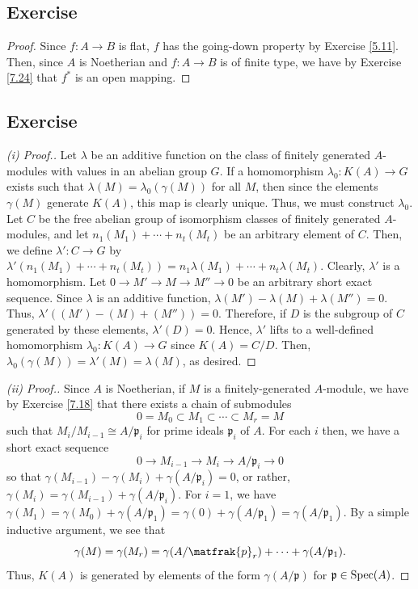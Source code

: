 \subsection{Exercise}\label{7.25}

\begin{proof}
Since $f : A \to B$ is flat, $f$ has the going-down property by Exercise \ref{5.11}. Then, since $A$ is Noetherian and $f : A \to B$ is of finite type,
we have by Exercise \ref{7.24} that $f^*$ is an open mapping.
\end{proof}

\subsection{Exercise}\label{7.26}

\begin{proof}[(i) Proof.]
Let $\lambda$ be an additive function on the class of finitely generated $A$-modules with values in an abelian group $G$. If a homomorphism 
$\lambda_0 : K(A) \to G$ exists such that $\lambda(M) = \lambda_0(\gamma(M))$ for all $M$, then since the elements $\gamma(M)$ generate $K(A)$, this map is clearly unique. 
Thus, we must construct $\lambda_0$. Let $C$ be the free abelian group of isomorphism classes of finitely generated $A$-modules, and let $n_1(M_1) + \cdots + n_t(M_t)$
be an arbitrary element of $C$. Then, we define $\lambda' : C \to G$ by $\lambda'(n_1(M_1) + \cdots + n_t(M_t)) = n_1\lambda(M_1) + \cdots + n_t\lambda(M_t)$.
Clearly, $\lambda'$ is a homomorphism. Let $0 \to M' \to M \to M'' \to 0$ be an arbitrary short exact sequence. Since $\lambda$ is an additive function,
$\lambda(M') - \lambda(M) + \lambda(M'') = 0$. Thus, $\lambda'((M') - (M) + (M'')) = 0$. Therefore, if $D$ is the subgroup of $C$ generated by these elements,
$\lambda'(D) = 0$. Hence, $\lambda'$ lifts to a well-defined homomorphism $\lambda_0 : K(A) \to G$ since $K(A) = C/D$. Then, $\lambda_0(\gamma(M)) = \lambda'(M) = \lambda(M)$,
as desired.
\end{proof}

\begin{proof}[(ii) Proof.]
Since $A$ is Noetherian, if $M$ is a finitely-generated $A$-module, we have by Exercise \ref{7.18} that there exists a chain of submodules
$$0 = M_0 \subset M_1 \subset \cdots \subset M_r = M$$
such that $M_i/M_{i-1} \cong A/\mathfrak{p}_i$ for prime ideals $\mathfrak{p}_i$ of $A$. For each $i$ then, we have a short exact sequence
$$0 \to M_{i-1} \to M_i \to A/\mathfrak{p}_i \to 0$$
so that $\gamma(M_{i-1}) - \gamma(M_i) + \gamma(A/\mathfrak{p}_i) = 0$, or rather, $\gamma(M_i) = \gamma(M_{i-1}) + \gamma(A/\mathfrak{p}_i)$. For $i=1$, we have 
$\gamma(M_1) = \gamma(M_0) + \gamma(A/\mathfrak{p}_1) = \gamma(0) + \gamma(A/\mathfrak{p}_1) = \gamma(A/\mathfrak{p}_1)$. By a simple inductive argument, we see that
$$\gamma(M) = \gamma(M_r) = \gamma(A/\matfrak{p}_r) + \cdots + \gamma(A/\mathfrak{p}_1).$$
Thus, $K(A)$ is generated by elements of the form $\gamma(A/\mathfrak{p})$ for $\mathfrak{p} \in \operatorname{Spec}(A)$.
\end{proof}

